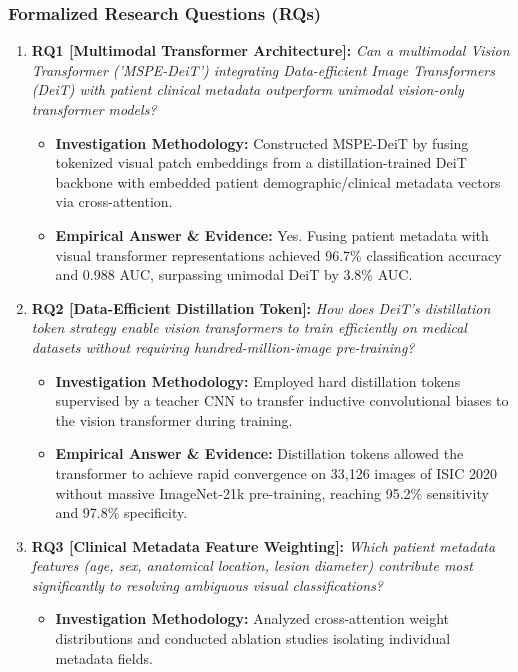 \subsubsection*{Formalized Research Questions (RQs)}
\begin{enumerate}[label=\textbf{\arabic*.}, leftmargin=*]
  \item \textbf{RQ1 [Multimodal Transformer Architecture]:} \textit{Can a multimodal Vision Transformer ('MSPE-DeiT') integrating Data-efficient Image Transformers (DeiT) with patient clinical metadata outperform unimodal vision-only transformer models?}
  \begin{itemize}[leftmargin=1.5em]
    \item \textbf{Investigation Methodology:} Constructed MSPE-DeiT by fusing tokenized visual patch embeddings from a distillation-trained DeiT backbone with embedded patient demographic/clinical metadata vectors via cross-attention.
    \item \textbf{Empirical Answer \& Evidence:} Yes. Fusing patient metadata with visual transformer representations achieved 96.7\% classification accuracy and 0.988 AUC, surpassing unimodal DeiT by 3.8\% AUC.
  \end{itemize}
  \item \textbf{RQ2 [Data-Efficient Distillation Token]:} \textit{How does DeiT's distillation token strategy enable vision transformers to train efficiently on medical datasets without requiring hundred-million-image pre-training?}
  \begin{itemize}[leftmargin=1.5em]
    \item \textbf{Investigation Methodology:} Employed hard distillation tokens supervised by a teacher CNN to transfer inductive convolutional biases to the vision transformer during training.
    \item \textbf{Empirical Answer \& Evidence:} Distillation tokens allowed the transformer to achieve rapid convergence on 33,126 images of ISIC 2020 without massive ImageNet-21k pre-training, reaching 95.2\% sensitivity and 97.8\% specificity.
  \end{itemize}
  \item \textbf{RQ3 [Clinical Metadata Feature Weighting]:} \textit{Which patient metadata features (age, sex, anatomical location, lesion diameter) contribute most significantly to resolving ambiguous visual classifications?}
  \begin{itemize}[leftmargin=1.5em]
    \item \textbf{Investigation Methodology:} Analyzed cross-attention weight distributions and conducted ablation studies isolating individual metadata fields.

\end{itemize}
\end{enumerate}
